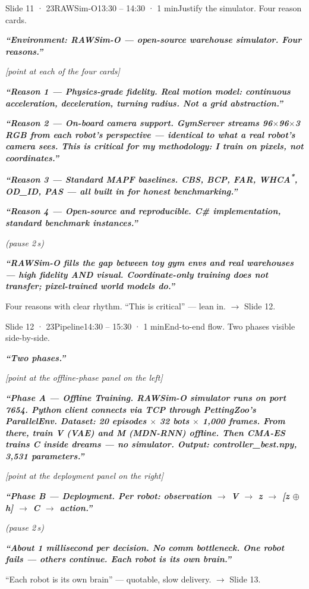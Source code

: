 \documentclass[11pt,a4paper]{article}
\newcommand{\say}[1]{%
    \par\vspace{0.3em}%
    \begingroup
    \leftskip=12pt
    \rightskip=8pt
    \color{thStrong}%
    \itshape\textbf{“#1”}%
    \par
    \endgroup
    \vspace{0.2em}
}
\newcommand{\beat}[1][2]{%
    \par\textcolor{thMuted}{\small\textit{(pause #1\,s)}}\par
    \vspace{0.2em}
}
\newcommand{\stage}[1]{%
    \par\textcolor{thMuted}{\small\textit{[#1]}}\par
    \vspace{0.2em}
}
\newcommand{\emphw}[1]{\textbf{\textcolor{thAmber}{#1}}}
\newcommand{\emphteal}[1]{\textbf{\textcolor{thTeal}{#1}}}
\begin{document}
\begin{slide}{Slide 11 · 23}{RAWSim-O}{13:30 – 14:30 · 1 min}{Justify the simulator. Four reason cards.}
\say{Environment: \emphw{RAWSim-O} — open-source warehouse simulator. Four reasons.}

\stage{point at each of the four cards}

\say{\textbf{Reason 1 — Physics-grade fidelity.} Real motion model: continuous acceleration, deceleration, turning radius. Not a grid abstraction.}

\say{\textbf{Reason 2 — On-board camera support.} GymServer streams 96$\times$96$\times$3 RGB from each robot's perspective — \emphw{identical to what a real robot's camera sees}. \textbf{This is critical} for my methodology: I train on pixels, not coordinates.}

\say{\textbf{Reason 3 — Standard MAPF baselines.} CBS, BCP, FAR, WHCA\textsuperscript{*}, OD\_ID, PAS — all built in for honest benchmarking.}

\say{\textbf{Reason 4 — Open-source and reproducible.} C\# implementation, standard benchmark instances.}

\beat
\say{RAWSim-O fills the gap between toy gym envs and real warehouses — \textbf{high fidelity AND visual}. Coordinate-only training does not transfer; \emphw{pixel-trained world models do}.}

\begin{stagebox}
Four reasons with clear rhythm. ``This is critical'' — lean in. $\rightarrow$ Slide 12.
\end{stagebox}
\end{slide}

\begin{slide}{Slide 12 · 23}{Pipeline}{14:30 – 15:30 · 1 min}{End-to-end flow. Two phases visible side-by-side.}
\say{Two phases.}

\stage{point at the offline-phase panel on the left}

\say{\emphw{Phase A — Offline Training.} RAWSim-O simulator runs on port 7654. Python client connects via TCP through PettingZoo's ParallelEnv. Dataset: 20 episodes $\times$ 32 bots $\times$ 1{,}000 frames. From there, \textbf{train V (VAE) and M (MDN-RNN) offline}. Then \emphteal{CMA-ES trains C inside dreams — no simulator}. Output: \emphw{controller\_best.npy, 3{,}531 parameters}.}

\stage{point at the deployment panel on the right}

\say{\emphw{Phase B — Deployment.} Per robot: observation $\rightarrow$ V $\rightarrow$ z $\rightarrow$ [z $\oplus$ h] $\rightarrow$ C $\rightarrow$ action.}
\beat
\say{\textbf{About 1 millisecond per decision. No comm bottleneck. One robot fails — others continue. Each robot is its own brain.}}

\begin{stagebox}
``Each robot is its own brain'' — quotable, slow delivery. $\rightarrow$ Slide 13.
\end{stagebox}
\end{slide}
\end{document}
